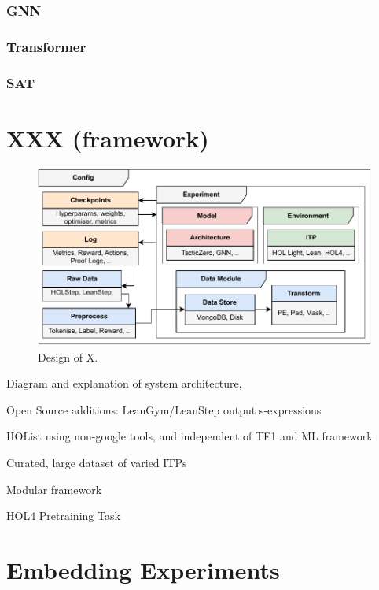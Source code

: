 \documentclass[letterpaper]{article} %
\begin{document}
    \subsubsection{GNN}

    \subsubsection{Transformer}

    \subsubsection{SAT}


    \section{XXX (framework)}

    \begin{figure}[h]
        \centering
        \includegraphics[width=\linewidth]{framework}
        \caption{Design of X. }
        \label{fig:framework}
    \end{figure}


    Diagram and explanation of system architecture,

    Open Source additions:
    LeanGym/LeanStep output s-expressions

    HOList using non-google tools, and independent of TF1 and ML framework

    Curated, large dataset of varied ITPs

    Modular framework

    HOL4 Pretraining Task


    \section{Embedding Experiments}
\end{document}
